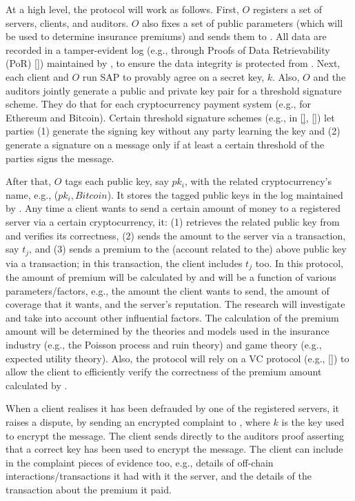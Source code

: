 At a high level, the protocol will work as follows. First, $O$ registers a set of servers,  clients, and auditors. $O$ also fixes a set of public parameters (which will be used to determine insurance premiums) and sends them to \cs. All data are recorded in a tamper-evident log (e.g., through Proofs of Data Retrievability (PoR) [\printcntr]) maintained by \cs, to ensure the data integrity is protected from \cs. 
%
Next, each client and $O$ run SAP to provably agree on a secret key, $k$. Also, $O$ and the auditors jointly generate a public and private key pair for a threshold signature scheme. They do that for each cryptocurrency payment system (e.g., for Ethereum and Bitcoin). Certain threshold signature schemes (e.g.,  in \href{https://link.springer.com/chapter/10.1007/3-540-44987-6_10}{[\printcntr]}, \href{https://link.springer.com/chapter/10.1007/978-3-319-39555-5_9}{[\printcntr]}) let parties (1) generate the signing key without any party learning the key and (2) generate a signature on a message only if at least a certain threshold of the parties signs the message. 

After that, $O$ tags each public key, say $pk_i$, with the related cryptocurrency's name, e.g., ($pk_{i}, Bitcoin$). It stores the tagged public keys in the log maintained by \cs. 
% 
 Any time a client wants to send a certain amount of money to a registered server via a certain cryptocurrency, it: (1) retrieves the related public key from \cs and verifies its correctness, (2) sends the amount to the server via a transaction, say $t_j$, and (3) sends a premium to the (account related to the) above public key via a transaction; in this transaction, the client includes $t_j$ too. In this protocol, the amount of premium will be calculated by \cs and will be a function of various parameters/factors, e.g.,  the amount the client wants to send, the amount of coverage that it wants, and the server's reputation. The research will investigate and take into account other influential factors. The calculation of the premium amount will be determined by the theories and models used in the insurance industry (e.g., the Poisson process and ruin theory) and game theory (e.g., expected utility theory).  Also, the protocol will rely on a VC protocol (e.g., \href{https://link.springer.com/chapter/10.1007/978-3-642-14623-7_25}{[\printcntr]}) to allow the client to efficiently verify the correctness of the premium amount calculated by \cs. 

When a client realises it has been defrauded by one of the registered servers, it raises a dispute, by sending an encrypted complaint to \cs, where $k$ is the key used to encrypt the message. The client sends directly to the auditors proof asserting that a correct key has been used to encrypt the message. The client can include in the complaint pieces of evidence too, e.g., details of off-chain interactions/transactions it had with it the server, and the details of the transaction about the premium it paid. 


